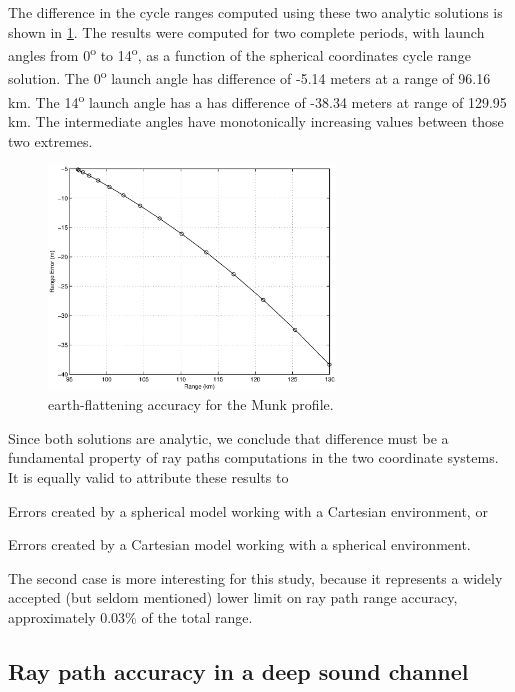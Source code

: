 \documentclass{ws-jca}
\begin{document}
The difference in the cycle ranges computed using these two analytic
solutions is shown in \ref{fig:flattening_accuracy}. The results were
computed for two complete periods, with launch angles from
0\textsuperscript{o} to 14\textsuperscript{o}, as a function of the
spherical coordinates cycle range solution. The 0\textsuperscript{o} launch
angle has difference of -5.14 meters at a range of 96.16 km. The
14\textsuperscript{o} launch angle has a has difference of -38.34 meters at
range of 129.95 km. The intermediate angles have monotonically increasing
values between those two extremes.
\begin{figure}[th]
	\centerline{\includegraphics[width=3in]{munk_range_compute.eps}} 
	\vspace*{8pt}
	\caption{earth-flattening accuracy for the Munk profile. 
	\label{fig:flattening_accuracy}}
\end{figure}

Since both solutions are analytic, we conclude that difference must be a
fundamental property of ray paths computations in the two coordinate
systems. It is equally valid to attribute these results to
\begin{itemlist}
\item Errors created by a spherical model working with a Cartesian environment, or
\item Errors created by a Cartesian model working with a spherical environment.
\end{itemlist}
The second case is more interesting for this study, because it represents a
widely accepted (but seldom mentioned) lower limit on ray path range
accuracy, approximately 0.03\% of the total range.

\subsection{Ray path accuracy in a deep sound channel}
\end{document}
